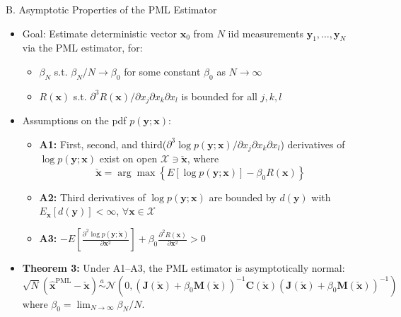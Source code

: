 \documentclass{beamer}
\begin{document}
\begin{frame}{B. Asymptotic Properties of the PML Estimator}
\begin{itemize}
    \item Goal: Estimate deterministic vector \( \mathbf{x}_0 \) from \( N \) iid measurements \( \mathbf{y}_1, \ldots, \mathbf{y}_N \) via the PML estimator, for: \\
    \begin{itemize}
        \item \( \beta_N \) s.t. \( \beta_N / N \to \beta_0 \) for some constant \( \beta_0 \) as \( N \to \infty \)
        \item \( R(\mathbf{x}) \) s.t. \( \partial^3 R(\mathbf{x})/\partial x_j \partial x_k \partial x_l \) is bounded for all \( j, k, l \)
    \end{itemize}
    \pause
    \item Assumptions on the pdf \( p(\mathbf{y}; \mathbf{x}) \):
    \begin{itemize}
        \item \textbf{A1:} First, second, and third(\( \partial^3 \log p(\mathbf{y}; \mathbf{x})/\partial x_j \partial x_k \partial x_l \)) derivatives of \( \log p(\mathbf{y}; \mathbf{x}) \) exist on open \( \mathcal{X} \ni \check{\mathbf{x}} \), where
        \[
        \check{\mathbf{x}} = \arg\max \left\{ E \left[ \log p(\mathbf{y}; \mathbf{x}) \right] - \beta_0 R(\mathbf{x}) \right\}
        \]
        \item \textbf{A2:} Third derivatives of \( \log p(\mathbf{y}; \mathbf{x}) \) are bounded by \( d(\mathbf{y}) \) with \( E_{\mathbf{x}}[d(\mathbf{y})] < \infty \), \( \forall \mathbf{x} \in \mathcal{X} \)
        \item \textbf{A3: } \(
        -E \left[ \frac{\partial^2 \log p(\mathbf{y}; \check{\mathbf{x}})}{\partial \mathbf{x}^2} \right] + \beta_0 \frac{\partial^2 R(\mathbf{x})}{\partial \mathbf{x}^2} > 0
        \)
    \end{itemize}
    \pause
    \item \textbf{Theorem 3:} Under A1--A3, the PML estimator is asymptotically normal:
    \[
    \sqrt{N}(\mathbf{\hat{x}}^{\text{PML}} - \check{\mathbf{x}}) \overset{a}{\sim}
    \mathcal{N}\left(0, (\mathbf{J}(\check{\mathbf{x}}) + \beta_0 \mathbf{M}(\check{\mathbf{x}}))^{-1} \mathbf{C}(\check{\mathbf{x}}) (\mathbf{J}(\check{\mathbf{x}}) + \beta_0 \mathbf{M}(\check{\mathbf{x}}))^{-1}\right)
    \]
    where $\beta_0 = \lim_{N \rightarrow \infty} \beta_N/N$.
\end{itemize}
\end{frame}
\end{document}
